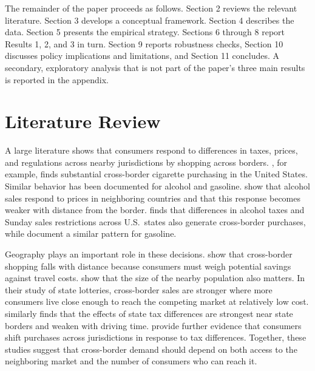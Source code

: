 \documentclass[12pt]{article}
\begin{document}
The remainder of the paper proceeds as follows. Section 2 reviews the relevant literature. Section 3
develops a conceptual framework. Section 4 describes the data. Section 5 presents the empirical strategy.
Sections 6 through 8 report Results 1, 2, and 3 in turn. Section 9 reports robustness checks, Section 10
discusses policy implications and limitations, and Section 11 concludes. A secondary, exploratory analysis
that is not part of the paper's three main results is reported in the appendix.

\section{Literature Review}

A large literature shows that consumers respond to differences in taxes, prices, and regulations across
nearby jurisdictions by shopping across borders. \citet{Lovenheim2008}, for example, finds substantial
cross-border cigarette purchasing in the United States. Similar behavior has been documented for alcohol and
gasoline. \citet{AsplundFribergWilander2007} show that alcohol sales respond to prices in neighboring
countries and that this response becomes weaker with distance from the border. \citet{Stehr2007} finds that
differences in alcohol taxes and Sunday sales restrictions across U.S.\ states also generate cross-border
purchases, while \citet{BanfiFilippiniHunt2005} document a similar pattern for gasoline.

Geography plays an important role in these decisions. \citet{ChandraHeadTappata2014} show that cross-border
shopping falls with distance because consumers must weigh potential savings against travel costs.
\citet{KnightSchiff2012} show that the size of the nearby population also matters. In their study of state
lotteries, cross-border sales are stronger where more consumers live close enough to reach the competing
market at relatively low cost. \citet{Agrawal2015} similarly finds that the effects of state tax differences
are strongest near state borders and weaken with driving time. \citet{BakerJohnsonKueng2021} provide further
evidence that consumers shift purchases across jurisdictions in response to tax differences. Together, these
studies suggest that cross-border demand should depend on both access to the neighboring market and the
number of consumers who can reach it.
\end{document}
